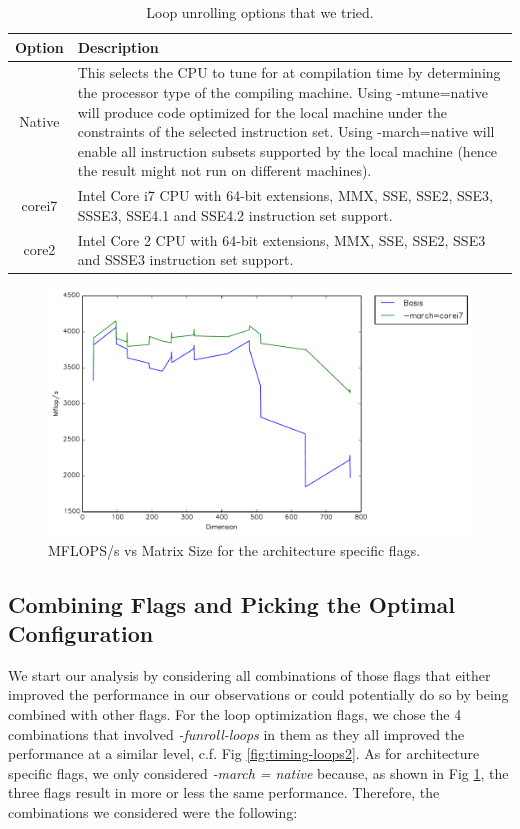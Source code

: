 \documentclass{article}
\begin{document}
\begin{table}
\begin{center}
    \begin{tabular}{ | c | p{10cm} |}
    \hline
    Option & Description \\ \hline
    Native  & This selects the CPU to tune for at compilation time by determining the processor type of the compiling machine. Using -mtune=native will produce code optimized for the local machine under the constraints of the selected instruction set. Using -march=native will enable all instruction subsets supported by the local machine (hence the result might not run on different machines).  \\ \hline
    corei7 & Intel Core i7 CPU with 64-bit extensions, MMX, SSE, SSE2, SSE3, SSSE3, SSE4.1 and SSE4.2 instruction set support. \\ \hline
    core2 & Intel Core 2 CPU with 64-bit extensions, MMX, SSE, SSE2, SSE3 and SSSE3 instruction set support. \\ \hline
    \end{tabular}
    \caption{Loop unrolling options that we tried.}
    \label{tab:arch-march}
\end{center}
\end{table}


  \begin{figure}[h]
    \centering
    \includegraphics[width=.7\textwidth]{timing-march.pdf}
    \caption{MFLOPS/s vs Matrix Size for the architecture specific flags.}
    \label{fig:timing-march}
  \end{figure}
 
\subsection{Combining Flags and Picking the Optimal Configuration}

We start our analysis by considering all combinations of those flags that either improved the performance in our observations or could potentially do so by being combined with other flags. For the loop optimization flags, we chose the 4 combinations that involved \textit{-funroll-loops} in them as they all improved the performance at a similar level, c.f. Fig \ref{fig:timing-loops2}. As for architecture specific flags, we only considered \textit{-march = native} because, as shown in Fig \ref{fig:timing-march}, the three flags result in more or less the same performance.  Therefore, the combinations we considered were the following:
\end{document}
